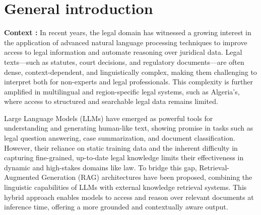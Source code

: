 \chapter*{General introduction}
\pagestyle{fancy}
\pagestyle{fancy}\chead{} \pagestyle{fancy}\rhead{}
\pagestyle{fancy}
\pagestyle{fancy}\cfoot{} \pagestyle{fancy}\rfoot{\thepage}
\textbf{Context :}
In recent years, the legal domain has witnessed a growing interest in the application of advanced natural language processing techniques to improve access to legal information and automate reasoning over juridical data. Legal texts—such as statutes, court decisions, and regulatory documents—are often dense, context-dependent, and linguistically complex, making them challenging to interpret both for non-experts and legal professionals. This complexity is further amplified in multilingual and region-specific legal systems, such as Algeria's, where access to structured and searchable legal data remains limited.

Large Language Models (LLMs) have emerged as powerful tools for understanding and generating human-like text, showing promise in tasks such as legal question answering, case summarization, and document classification. However, their reliance on static training data and the inherent difficulty in capturing fine-grained, up-to-date legal knowledge limits their effectiveness in dynamic and high-stakes domains like law. To bridge this gap, Retrieval-Augmented Generation (RAG) architectures have been proposed, combining the linguistic capabilities of LLMs with external knowledge retrieval systems. This hybrid approach enables models to access and reason over relevant documents at inference time, offering a more grounded and contextually aware output.

